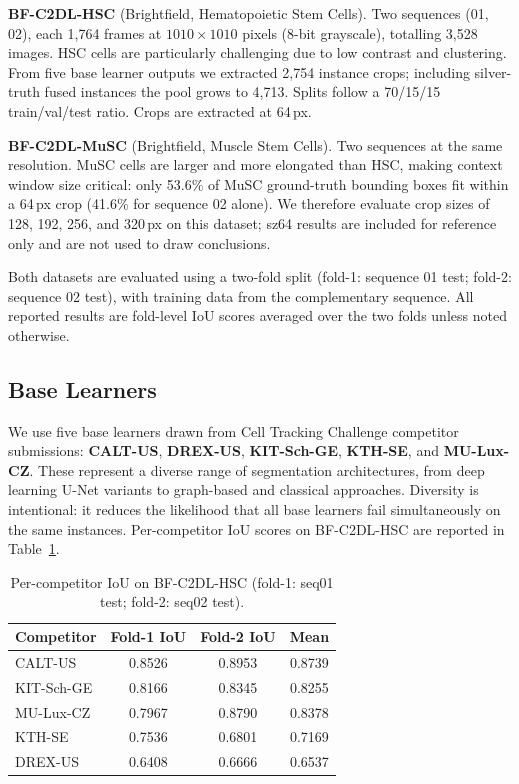 \textbf{BF-C2DL-HSC} (Brightfield, Hematopoietic Stem Cells). Two sequences (01, 02), each 1,764
frames at $1010\times1010$ pixels (8-bit grayscale), totalling 3,528 images. HSC cells are
particularly challenging due to low contrast and clustering. From five base learner outputs we
extracted 2,754 instance crops; including silver-truth fused instances the pool grows to 4,713.
Splits follow a 70/15/15 train/val/test ratio. Crops are extracted at 64\,px.

\textbf{BF-C2DL-MuSC} (Brightfield, Muscle Stem Cells). Two sequences at the same resolution. MuSC
cells are larger and more elongated than HSC, making context window size critical: only 53.6\% of
MuSC ground-truth bounding boxes fit within a 64\,px crop (41.6\% for sequence 02 alone). We
therefore evaluate crop sizes of 128, 192, 256, and 320\,px on this dataset; sz64 results are
included for reference only and are not used to draw conclusions.

Both datasets are evaluated using a two-fold split (fold-1: sequence 01 test; fold-2: sequence 02
test), with training data from the complementary sequence. All reported results are fold-level IoU
scores averaged over the two folds unless noted otherwise.

\subsection{Base Learners}
\label{sec:base_learners}

We use five base learners drawn from Cell Tracking Challenge competitor submissions:
\textbf{CALT-US}, \textbf{DREX-US}, \textbf{KIT-Sch-GE}, \textbf{KTH-SE}, and \textbf{MU-Lux-CZ}.
These represent a diverse range of segmentation architectures, from deep learning U-Net variants to
graph-based and classical approaches. Diversity is intentional: it reduces the likelihood that all
base learners fail simultaneously on the same instances. Per-competitor IoU scores on BF-C2DL-HSC
are reported in Table~\ref{tab:competitors}.

\begin{table}[ht]
\centering
\caption{Per-competitor IoU on BF-C2DL-HSC (fold-1: seq01 test; fold-2: seq02 test).}
\label{tab:competitors}
\begin{tabular}{lccc}
\hline
\textbf{Competitor} & \textbf{Fold-1 IoU} & \textbf{Fold-2 IoU} & \textbf{Mean} \\
\hline
CALT-US    & 0.8526 & 0.8953 & 0.8739 \\
KIT-Sch-GE & 0.8166 & 0.8345 & 0.8255 \\
MU-Lux-CZ  & 0.7967 & 0.8790 & 0.8378 \\
KTH-SE     & 0.7536 & 0.6801 & 0.7169 \\
DREX-US    & 0.6408 & 0.6666 & 0.6537 \\
\hline
\end{tabular}
\end{table}

